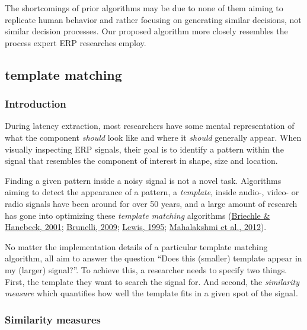 \documentclass[
  man,floatsintext]{apa7}
\begin{document}
The shortcomings of prior algorithms may be due to none of them aiming to replicate human behavior and rather focusing on generating similar decisions, not similar decision processes. Our proposed algorithm more closely resembles the process expert ERP researches employ.

\hypertarget{template-matching}{%
\subsection{template matching}\label{template-matching}}

\hypertarget{introduction}{%
\subsubsection{Introduction}\label{introduction}}

During latency extraction, most researchers have some mental representation of what the component \emph{should} look like and where it \emph{should} generally appear. When visually inspecting ERP signals, their goal is to identify a pattern within the signal that resembles the component of interest in shape, size and location.

Finding a given pattern inside a noisy signal is not a novel task. Algorithms aiming to detect the appearance of a pattern, a \emph{template}, inside audio-, video- or radio signals have been around for over 50 years, and a large amount of research has gone into optimizing these \emph{template matching} algorithms (\protect\hyperlink{ref-briechle2001template}{Briechle \& Hanebeck, 2001}; \protect\hyperlink{ref-brunelli2009template}{Brunelli, 2009}; \protect\hyperlink{ref-lewis1995fast}{Lewis, 1995}; \protect\hyperlink{ref-mahalakshmi2012image}{Mahalakshmi et al., 2012}).

No matter the implementation details of a particular template matching algorithm, all aim to answer the question ``Does this (smaller) template appear in my (larger) signal?''. To achieve this, a researcher needs to specify two things. First, the template they want to search the signal for. And second, the \emph{similarity measure} which quantifies how well the template fits in a given spot of the signal.

\hypertarget{similarity-measures}{%
\subsubsection{Similarity measures}\label{similarity-measures}}
\end{document}

